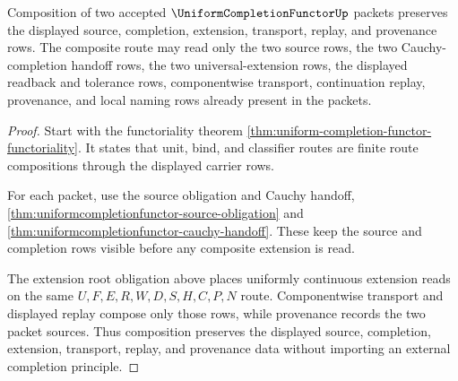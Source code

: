 \begin{theorem}
\label{thm:uniformcompletionfunctor-functorial-root-obligation}
Composition of two accepted $\UniformCompletionFunctorUp$ packets preserves the displayed source, completion, extension, transport, replay, and provenance rows. The composite route may read only the two source rows, the two Cauchy-completion handoff rows, the two universal-extension rows, the displayed readback and tolerance rows, componentwise transport, continuation replay, provenance, and local naming rows already present in the packets.
\end{theorem}
\begin{proof}
Start with the functoriality theorem \autoref{thm:uniform-completion-functor-functoriality}. It states that unit, bind, and classifier routes are finite route compositions through the displayed carrier rows.

For each packet, use the source obligation and Cauchy handoff, \autoref{thm:uniformcompletionfunctor-source-obligation} and \autoref{thm:uniformcompletionfunctor-cauchy-handoff}. These keep the source and completion rows visible before any composite extension is read.

The extension root obligation above places uniformly continuous extension reads on the same $U,F,E,R,W,D,S,H,C,P,N$ route. Componentwise transport and displayed replay compose only those rows, while provenance records the two packet sources. Thus composition preserves the displayed source, completion, extension, transport, replay, and provenance data without importing an external completion principle.
\end{proof}

